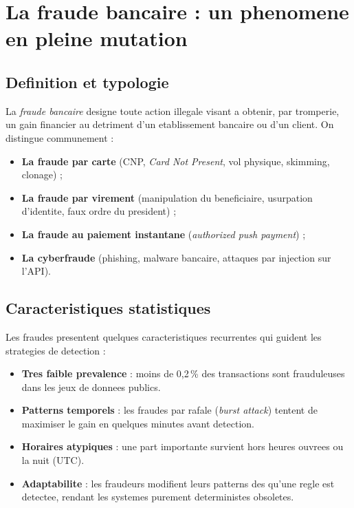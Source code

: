 \documentclass[12pt,a4paper,oneside]{report}
\begin{document}
\section{La fraude bancaire : un phenomene en pleine mutation}

\subsection{Definition et typologie}

La \emph{fraude bancaire} designe toute action illegale visant a obtenir, par
tromperie, un gain financier au detriment d'un etablissement bancaire ou d'un
client. On distingue communement :

\begin{itemize}[leftmargin=*]
  \item \textbf{La fraude par carte} (CNP, \emph{Card Not Present}, vol
        physique, skimming, clonage) ;
  \item \textbf{La fraude par virement} (manipulation du beneficiaire,
        usurpation d'identite, faux ordre du president) ;
  \item \textbf{La fraude au paiement instantane} (\emph{authorized push
        payment}) ;
  \item \textbf{La cyberfraude} (phishing, malware bancaire, attaques par
        injection sur l'API).
\end{itemize}

\subsection{Caracteristiques statistiques}

Les fraudes presentent quelques caracteristiques recurrentes qui guident les
strategies de detection :

\begin{itemize}[leftmargin=*]
  \item \textbf{Tres faible prevalence} : moins de 0,2\,\% des transactions
        sont frauduleuses dans les jeux de donnees publics.
  \item \textbf{Patterns temporels} : les fraudes par rafale (\emph{burst
        attack}) tentent de maximiser le gain en quelques minutes avant
        detection.
  \item \textbf{Horaires atypiques} : une part importante survient hors
        heures ouvrees ou la nuit (UTC).
  \item \textbf{Adaptabilite} : les fraudeurs modifient leurs patterns des
        qu'une regle est detectee, rendant les systemes purement
        deterministes obsoletes.
\end{itemize}
\end{document}
